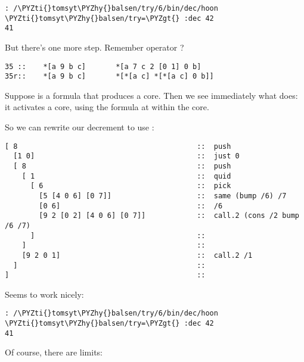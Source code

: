 \begin{framed_shaded}
\begin{Verbatim}[fontsize=\relsize{-2.5},commandchars=\\\{\}]
: /\PYZti{}tomsyt\PYZhy{}balsen/try/6/bin/dec/hoon
\PYZti{}tomsyt\PYZhy{}balsen/try=\PYZgt{} :dec 42
41
\end{Verbatim}
\end{framed_shaded}
But there's one more step.  Remember operator ?

\begin{framed_shaded}
\begin{Verbatim}[fontsize=\relsize{-2.5},commandchars=\\\{\}]
35 ::    *[a 9 b c]       *[a 7 c 2 [0 1] 0 b]
35r::    *[a 9 b c]       *[*[a c] *[*[a c] 0 b]]
\end{Verbatim}
\end{framed_shaded}
Suppose  is a formula that produces a core.  Then we see
immediately what  does: it activates a core, using the formula
at  within the core.

So we can rewrite our decrement to use :

\begin{framed_shaded}
\begin{Verbatim}[fontsize=\relsize{-2.5},commandchars=\\\{\}]
[ 8                                          ::  push
  [1 0]                                      ::  just 0
  [ 8                                        ::  push
    [ 1                                      ::  quid
      [ 6                                    ::  pick
        [5 [4 0 6] [0 7]]                    ::  same (bump /6) /7
        [0 6]                                ::  /6
        [9 2 [0 2] [4 0 6] [0 7]]            ::  call.2 (cons /2 bump /6 /7)
      ]                                      :: 
    ]                                        :: 
    [9 2 0 1]                                ::  call.2 /1
  ]                                          ::
]                                            :: 
\end{Verbatim}
\end{framed_shaded}
Seems to work nicely:

\begin{framed_shaded}
\begin{Verbatim}[fontsize=\relsize{-2.5},commandchars=\\\{\}]
: /\PYZti{}tomsyt\PYZhy{}balsen/try/6/bin/dec/hoon
\PYZti{}tomsyt\PYZhy{}balsen/try=\PYZgt{} :dec 42
41
\end{Verbatim}
\end{framed_shaded}
Of course, there are limits:

